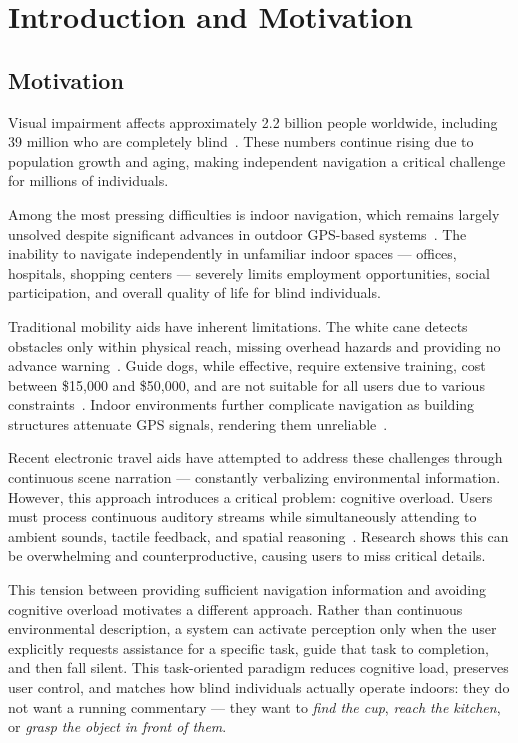 \chapter{Introduction and Motivation}
\label{ch:introduction}

\section{Motivation}
\label{sec:motivation}

Visual impairment affects approximately 2.2 billion people worldwide, including 39
million who are completely blind~\cite{bourne2017global}. These numbers continue
rising due to population growth and aging, making independent navigation a critical
challenge for millions of individuals.

Among the most pressing difficulties is indoor navigation, which remains largely
unsolved despite significant advances in outdoor GPS-based
systems~\cite{fernandes2019review}. The inability to navigate independently in
unfamiliar indoor spaces --- offices, hospitals, shopping centers --- severely limits
employment opportunities, social participation, and overall quality of life for blind
individuals.

Traditional mobility aids have inherent limitations. The white cane detects obstacles
only within physical reach, missing overhead hazards and providing no advance
warning~\cite{dakopoulos2010wearable}. Guide dogs, while effective, require extensive
training, cost between \$15{,}000 and \$50{,}000, and are not suitable for all users
due to various constraints~\cite{kandalan2020techniques}. Indoor environments further
complicate navigation as building structures attenuate GPS signals, rendering them
unreliable~\cite{li2018vision}.

Recent electronic travel aids have attempted to address these challenges through
continuous scene narration --- constantly verbalizing environmental information.
However, this approach introduces a critical problem: cognitive overload. Users must
process continuous auditory streams while simultaneously attending to ambient sounds,
tactile feedback, and spatial reasoning~\cite{martinez2014cognitive}. Research shows
this can be overwhelming and counterproductive, causing users to miss critical
details.

This tension between providing sufficient navigation information and avoiding
cognitive overload motivates a different approach. Rather than continuous
environmental description, a system can activate perception only when the user
explicitly requests assistance for a specific task, guide that task to completion,
and then fall silent. This task-oriented paradigm reduces cognitive load, preserves
user control, and matches how blind individuals actually operate indoors: they do not
want a running commentary --- they want to \emph{find the cup}, \emph{reach the
kitchen}, or \emph{grasp the object in front of them}.

